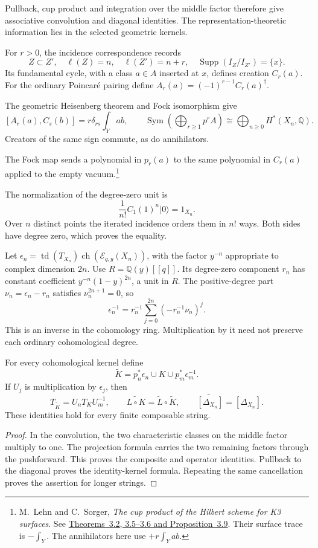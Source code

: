 Pullback, cup product and integration over the middle factor
therefore give associative convolution and diagonal identities.
The representation-theoretic information lies in the selected
geometric kernels.

For \(r>0\), the incidence correspondence records
\[
 Z\subset Z',\quad \ell(Z)=n,\quad \ell(Z')=n+r,\quad
 \operatorname{Supp}(I_Z/I_{Z'})=\{x\}.
\]
Its fundamental cycle, with a class \(a\in A\) inserted at
\(x\), defines creation \(C_r(a)\).
For the ordinary Poincar\'e pairing define
\(A_r(a)=(-1)^{r-1}C_r(a)^\dagger\).

The geometric Heisenberg theorem and Fock isomorphism give
\[
 [A_r(a),C_s(b)]=r\delta_{rs}\int_Yab,\qquad
 \operatorname{Sym}\!\left(\bigoplus_{r\geq1}p^rA\right)
     \cong\bigoplus_{n\geq0}H^*(X_n,\mathbb Q).
\]
Creators of the same sign commute, as do annihilators.

The Fock map sends a polynomial in \(p_r(a)\) to the same
polynomial in \(C_r(a)\) applied to the empty vacuum.\footnote{
M.~Lehn and C.~Sorger,
\emph{The cup product of the Hilbert scheme for K3 surfaces}.
See \href{https://arxiv.org/abs/math/0012166}
{Theorems~3.2, 3.5--3.6 and Proposition~3.9}.
Their surface trace is \(-\int_Y\).
The annihilators here use \(+r\int_Yab\).}

The normalization of the degree-zero unit is
\[
 \frac1{n!}C_1(1)^n|0\rangle=1_{X_n}.
\]
Over \(n\) distinct points the iterated incidence orders them
in \(n!\) ways. Both sides have degree zero, which proves
the equality.

Let \(\epsilon_n=\operatorname{td}(T_{X_n})
\operatorname{ch}(\mathcal E_{q,y}(X_n))\), with
the factor \(y^{-n}\) appropriate to complex dimension \(2n\).
Use \(R=\mathbb Q(y)[[q]]\).
Its degree-zero component \(r_n\) has constant coefficient
\(y^{-n}(1-y)^{2n}\), a unit in \(R\).
The positive-degree part \(\nu_n=\epsilon_n-r_n\) satisfies
\(\nu_n^{2n+1}=0\), so
\[
 \epsilon_n^{-1}
    =r_n^{-1}\sum_{j=0}^{2n}(-r_n^{-1}\nu_n)^j.
\]
This is an inverse in the cohomology ring.
Multiplication by it need not preserve each ordinary
cohomological degree.

\begin{proposition}\label{mht:prop:compact-transport}
For every cohomological kernel define
\[
 \widetilde K=p_n^*\epsilon_n\cup K\cup p_m^*\epsilon_m^{-1}.
\]
If \(U_j\) is multiplication by \(\epsilon_j\), then
\[
 T_{\widetilde K}=U_nT_KU_m^{-1},\qquad
 \widetilde{L\circ K}=\widetilde L\circ\widetilde K,\qquad
 \widetilde{[\Delta_{X_n}]}=[\Delta_{X_n}].
\]
These identities hold for every finite composable string.
\end{proposition}
\begin{proof}
In the convolution, the two characteristic classes on the
middle factor multiply to one.
The projection formula carries the two remaining factors
through the pushforward. This proves the composite and
operator identities. Pullback to the diagonal proves the
identity-kernel formula. Repeating the same cancellation
proves the assertion for longer strings.
\end{proof}

